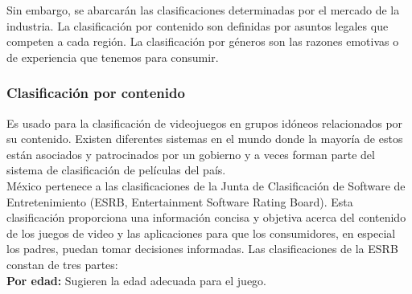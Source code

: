 Sin embargo, se abarcarán las clasificaciones determinadas por el mercado de la industria. La clasificación por contenido son definidas por asuntos legales que competen a cada región. La clasificación por géneros son las razones emotivas o de experiencia que tenemos para consumir.
\\[1pt]

\subsubsection{Clasificación por contenido}
	Es usado para la clasificación de videojuegos en grupos idóneos relacionados por su contenido. Existen diferentes sistemas en el mundo donde la mayoría de estos están asociados y patrocinados por un gobierno y a veces forman parte del sistema de clasificación de películas del país.\\[1pt]	
	
	México pertenece a las clasificaciones de la Junta de Clasificación de Software de Entretenimiento (ESRB, Entertainment Software Rating Board)\cite{vid02}. Esta clasificación proporciona una información concisa y objetiva acerca del contenido de los juegos de video y las aplicaciones para que los consumidores, en especial los padres, puedan tomar decisiones informadas. Las clasificaciones de la ESRB constan de tres partes:\\[1pt]
			
\textbf{Por edad: }
Sugieren la edad adecuada para el juego.		
\\[1pt]
	
